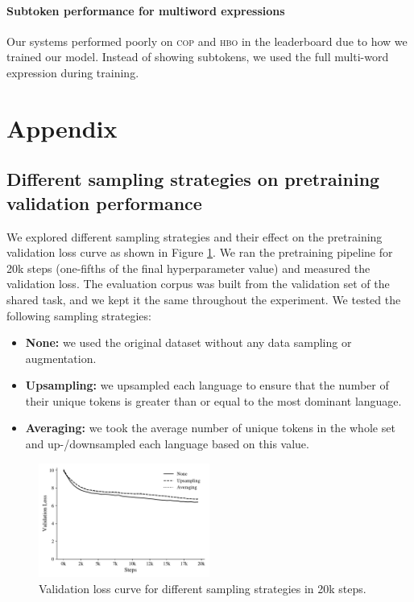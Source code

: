 \documentclass[11pt]{article}
\begin{document}
\paragraph{Subtoken performance for multiword expressions}
Our systems performed poorly on \textsc{cop} and \textsc{hbo} in the leaderboard due to how we trained our model.
Instead of showing subtokens, we used the full multi-word expression during training.



\appendix

\section{Appendix}
\label{sec:appendix}

\subsection{Different sampling strategies on pretraining validation performance}
\label{sec:appendix_sampling}

We explored different sampling strategies and their effect on the pretraining validation loss curve as shown in Figure \ref{fig:effect_sampling}.
We ran the pretraining pipeline for 20k steps (one-fifths of the final hyperparameter value) and measured the validation loss.
The evaluation corpus was built from the validation set of the shared task, and we kept it the same throughout the experiment.
We tested the following sampling strategies:

\begin{itemize}
  \item \textbf{None:} we used the original dataset without any data sampling or augmentation.
  \item \textbf{Upsampling:} we upsampled each language to ensure that the number of their unique tokens is greater than or equal to the most dominant language.
  \item \textbf{Averaging:} we took the average number of unique tokens in the whole set and up-/downsampled each language based on this value.
\end{itemize}

\begin{figure}[t]
  \centering
  \includegraphics[width=0.5\textwidth]{figures/effect_sampling.pdf}
  \caption{Validation loss curve for different sampling strategies in 20k steps.}
  \label{fig:effect_sampling}
\end{figure}
\end{document}
